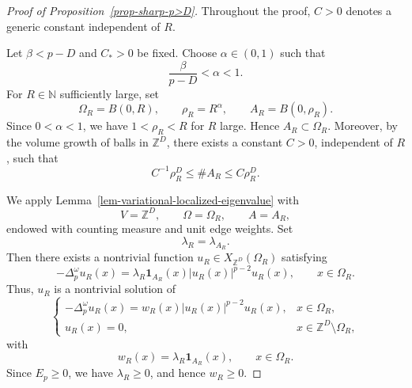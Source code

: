 \documentclass[twoside,12pt,letter]{article}
\theoremstyle{plain}
\theoremstyle{definition}
\theoremstyle{remark}
\numberwithin{equation}{section}
\begin{document}
\begin{proof}[Proof of Proposition~\ref{prop-sharp-p>D}]
Throughout the proof, \(C>0\) denotes a generic constant independent of \(R\).

Let \(\beta<p-D\) and \(C_*>0\) be fixed. Choose \(\alpha\in(0,1)\) such that
\[
\frac{\beta}{p-D}<\alpha<1.
\]
For \(R\in\mathbb{N}\) sufficiently large, set
\[
\Omega_R=B(0,R),
\qquad
\rho_R=R^\alpha,
\qquad
A_R=B(0,\rho_R).
\]
Since \(0<\alpha<1\), we have \(1<\rho_R<R\) for \(R\) large. Hence
\(A_R\subset\Omega_R\). Moreover, by the volume growth of balls in
\(\mathbb{Z}^D\), there exists a constant \(C>0\), independent of \(R\), such
that
\begin{equation}\label{sharp-volume-AR}
C^{-1}\rho_R^D\le \#A_R\le C\rho_R^D.
\end{equation}

We apply Lemma~\ref{lem-variational-localized-eigenvalue} with
\[
V=\mathbb{Z}^D,\qquad \Omega=\Omega_R,\qquad A=A_R,
\]
endowed with counting measure and unit edge weights. Set
\[
\lambda_R=\lambda_{A_R}.
\]
Then there exists a nontrivial function
\(u_R\in X_{\mathbb{Z}^D}(\Omega_R)\) satisfying
\[
-\Delta_p^\omega u_R(x)
=
\lambda_R\mathbf{1}_{A_R}(x)|u_R(x)|^{p-2}u_R(x),
\qquad x\in\Omega_R.
\]
Thus, \(u_R\) is a nontrivial solution of
\[
\left\{
\begin{array}{ll}
-\Delta_p^\omega u_R(x)
=
w_R(x)|u_R(x)|^{p-2}u_R(x),
& x\in\Omega_R,\\[4pt]
u_R(x)=0,
& x\in\mathbb{Z}^D\setminus\Omega_R,
\end{array}
\right.
\]
with
\[
w_R(x)=\lambda_R\mathbf{1}_{A_R}(x),
\qquad x\in\Omega_R.
\]
Since \(E_p\ge 0\), we have \(\lambda_R\ge 0\), and hence \(w_R\ge 0\).


\end{proof}
\end{document}
